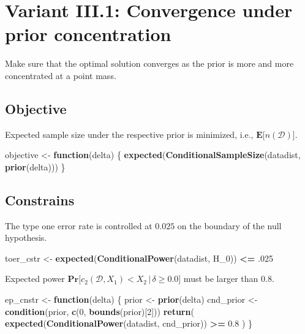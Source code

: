 \documentclass[]{book}
\newenvironment{Shaded}{\begin{snugshade}}{\end{snugshade}}
\newcommand{\ControlFlowTok}[1]{\textcolor[rgb]{0.13,0.29,0.53}{\textbf{#1}}}
\newcommand{\DecValTok}[1]{\textcolor[rgb]{0.00,0.00,0.81}{#1}}
\newcommand{\FloatTok}[1]{\textcolor[rgb]{0.00,0.00,0.81}{#1}}
\newcommand{\KeywordTok}[1]{\textcolor[rgb]{0.13,0.29,0.53}{\textbf{#1}}}
\newcommand{\NormalTok}[1]{#1}
\newcommand{\OperatorTok}[1]{\textcolor[rgb]{0.81,0.36,0.00}{\textbf{#1}}}
\newcommand{\StringTok}[1]{\textcolor[rgb]{0.31,0.60,0.02}{#1}}
\begin{document}
\hypertarget{variantIII_1}{%
\section{Variant III.1: Convergence under prior concentration}\label{variantIII_1}}

Make sure that the optimal solution converges as the prior is more and more
concentrated at a point mass.

\hypertarget{objective-6}{%
\subsection{Objective}\label{objective-6}}

Expected sample size under the respective prior is minimized, i.e.,
\(\boldsymbol{E}\big[n(\mathcal{D})\big]\).

\begin{Shaded}
\begin{Highlighting}[]
\NormalTok{objective <-}\StringTok{ }\ControlFlowTok{function}\NormalTok{(delta) \{}
    \KeywordTok{expected}\NormalTok{(}\KeywordTok{ConditionalSampleSize}\NormalTok{(datadist, }\KeywordTok{prior}\NormalTok{(delta)))}
\NormalTok{\}}
\end{Highlighting}
\end{Shaded}

\hypertarget{constrains-6}{%
\subsection{Constrains}\label{constrains-6}}

The type one error rate is controlled at \(0.025\) on the boundary of the
null hypothesis.

\begin{Shaded}
\begin{Highlighting}[]
\NormalTok{toer_cstr <-}\StringTok{ }\KeywordTok{expected}\NormalTok{(}\KeywordTok{ConditionalPower}\NormalTok{(datadist, H_}\DecValTok{0}\NormalTok{)) }\OperatorTok{<=}\StringTok{ }\FloatTok{.025}
\end{Highlighting}
\end{Shaded}

Expected power \(\boldsymbol{Pr}\big[c_2(\mathcal{D}, X_1) < X_2\,|\,\delta\geq 0.0\big]\) must be larger than \(0.8\).

\begin{Shaded}
\begin{Highlighting}[]
\NormalTok{ep_cnstr <-}\StringTok{ }\ControlFlowTok{function}\NormalTok{(delta) \{}
\NormalTok{    prior     <-}\StringTok{ }\KeywordTok{prior}\NormalTok{(delta)}
\NormalTok{    cnd_prior <-}\StringTok{ }\KeywordTok{condition}\NormalTok{(prior, }\KeywordTok{c}\NormalTok{(}\DecValTok{0}\NormalTok{, }\KeywordTok{bounds}\NormalTok{(prior)[}\DecValTok{2}\NormalTok{]))}
    \KeywordTok{return}\NormalTok{( }\KeywordTok{expected}\NormalTok{(}\KeywordTok{ConditionalPower}\NormalTok{(datadist, cnd_prior)) }\OperatorTok{>=}\StringTok{ }\FloatTok{0.8}\NormalTok{ )}
\NormalTok{\}}
\end{Highlighting}
\end{Shaded}
\end{document}
